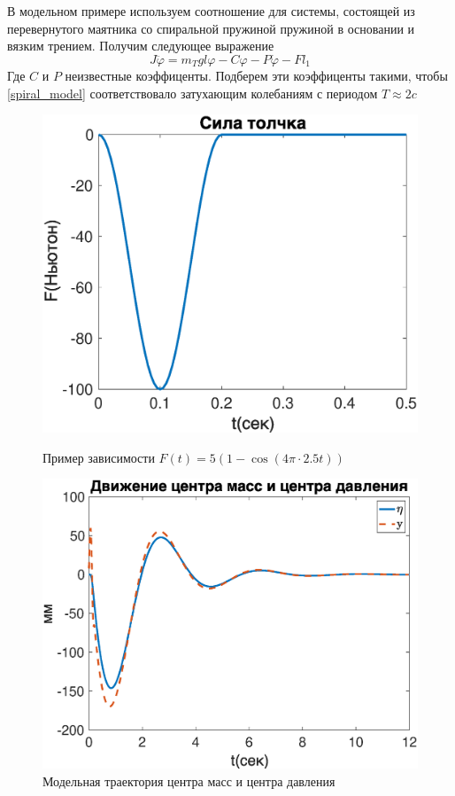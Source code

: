 \documentclass[a4paper,12pt, openany]{book}
\theoremstyle{plain} %
\theoremstyle{definition} %
\theoremstyle{remark} %
\numberwithin{equation}{chapter}
\begin{document}
{В модельном примере используем соотношение для системы, состоящей из перевернутого маятника со спиральной пружиной пружиной в основании и вязким трением.
Получим следующее выражение
\begin{equation}\label{spiral_model}
    J\ddot{\varphi}=m_Tgl\varphi-C\varphi-P\dot\varphi-Fl_1
\end{equation}
Где $C$ и $P$ неизвестные коэффиценты.
Подберем эти коэффиценты такими, чтобы \eqref{spiral_model} соответствовало затухающим колебаниям
с периодом $T\approx2c$
\begin{figure}[h!]
    \begin{center}
        \begin{minipage}[h]{0.48\linewidth}
            \includegraphics[width=1\linewidth]{push_model.eps}
            \caption{Пример зависимости \break $F(t)=5(1-\cos(4\pi\cdot2.5t))$}
        \end{minipage}
        \hfill
        \begin{minipage}[h]{0.48\linewidth}
            \includegraphics[width=1\linewidth]{eta_model.eps}
            \caption{Модельная траектория центра масс и центра давления}
        \end{minipage}
    \end{center}
\end{figure}

}
\end{document}
